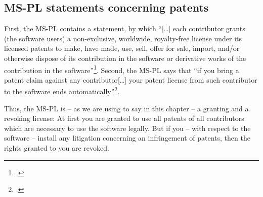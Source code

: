 \subsection{MS-PL statements concerning patents}\label{subsec:MsplPatentClause}

First, the MS-PL contains a statement, by which \enquote{[\ldots] each
contributor grants (the software users) a non-exclusive, worldwide, royalty-free
license under its licensed patents to make, have made, use, sell, offer for
sale, import, and/or otherwise dispose of its contribution in the software or
derivative works of the contribution in the software}\footcite[cf.][\nopage wp
§2.B]{MsplOsiLicense2013a}. Second, the MS-PL says that \enquote{if you bring a
patent claim against any contributor[\ldots] your patent license from such
contributor to the software ends automatically}\footcite[cf.][\nopage wp
§3.B]{MsplOsiLicense2013a}.

Thus, the MS-PL is -- as we are using to say in this chapter -- a granting and a
revoking license: At first you are granted to use all patents of all
contributors which are necessary to use the software legally. But if you -- with
respect to the software -- install any litigation concerning an infringement of
patents, then the rights granted to you are revoked.




% 
